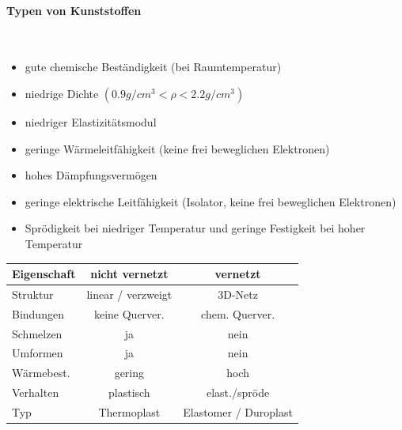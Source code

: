 \documentclass[12pt,twocolumn]{article}
\begin{document}
    \paragraph{Typen von Kunststoffen}\mbox{}\\
    \begin{itemize}[label={}, leftmargin=*,  itemsep=0.01em]
        \item gute chemische Beständigkeit (bei Raumtemperatur)
        \item niedrige Dichte $(0.9 g/cm^3 < \rho < 2.2 g/cm^3 )$
        \item niedriger Elastizitätsmodul
        \item geringe Wärmeleitfähigkeit (keine frei beweglichen Elektronen)
        \item hohes Dämpfungsvermögen
        \item geringe elektrische Leitfähigkeit (Isolator, keine frei beweglichen Elektronen)
        \item Sprödigkeit bei niedriger Temperatur und geringe Festigkeit bei hoher
        Temperatur
    \end{itemize}
    \begin{center}
        \small
        \begin{tabular}{|l|c|c|}
            \hline
            \textbf{Eigenschaft} & \textbf{nicht vernetzt} & \textbf{vernetzt} \\
            \hline
            Struktur & linear / verzweigt & 3D-Netz \\
            \hline
            Bindungen & keine Querver. & chem. Querver. \\
            \hline
            Schmelzen & ja & nein \\
            \hline
            Umformen & ja & nein \\
            \hline
            Wärmebest. & gering & hoch \\
            \hline
            Verhalten & plastisch & elast./spröde \\
            \hline
            Typ & Thermoplast & Elastomer / Duroplast \\
            \hline
        \end{tabular}
    \end{center}
    
    
\end{document}
